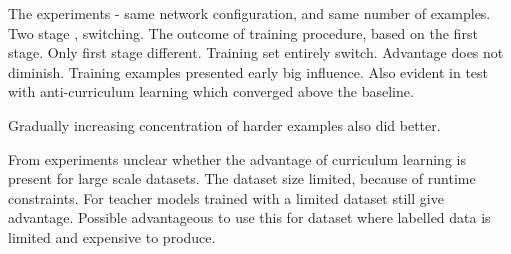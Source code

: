 The experiments - same network configuration, and same number of examples. Two stage , switching. The outcome of training procedure, based on the first stage. Only first stage different. Training set entirely switch. Advantage does not diminish. Training examples presented early big influence. Also evident in test with anti-curriculum learning which converged above the baseline.

Gradually increasing concentration of harder examples also did better.

From experiments unclear whether the advantage of curriculum learning is present for large scale datasets. The dataset size limited, because of runtime constraints. For teacher models trained with a limited dataset still give advantage. Possible advantageous to use this for dataset where labelled data is limited and expensive to produce.



